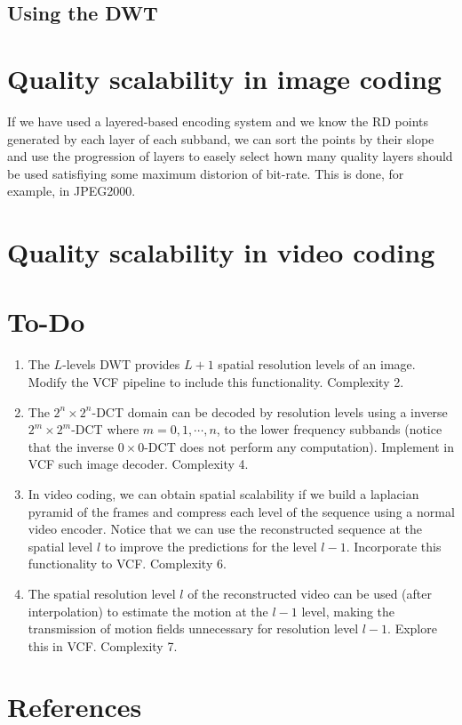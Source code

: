 \subsection{Using the DWT}

\section{Quality scalability in image coding}

If we have used a layered-based encoding system and we know the RD
points generated by each layer of each subband, we can sort the points
by their slope and use the progression of layers to easely select hown
many quality layers should be used satisfiying some maximum distorion
of bit-rate. This is done, for example, in JPEG2000.

\section{Quality scalability in video coding}

\section{To-Do}
\begin{enumerate}
\item The $L$-levels DWT provides $L+1$ spatial resolution levels of
  an image. Modify the VCF pipeline to include this
  functionality. Complexity 2.
\item The $2^n\times 2^n$-DCT domain can be decoded by resolution
  levels using a inverse $2^m\times 2^m$-DCT where $m=0,1,\cdots,n$,
  to the lower frequency subbands (notice that the inverse
  $0\times 0$-DCT does not perform any computation). Implement in VCF
  such image decoder. Complexity 4.
\item In video coding, we can obtain spatial scalability if we build a
  laplacian pyramid of the frames and compress each level of the
  sequence using a normal video encoder. Notice that we can use the
  reconstructed sequence at the spatial level $l$ to improve the
  predictions for the level $l-1$. Incorporate this functionality to
  VCF. Complexity 6.
\item The spatial resolution level $l$ of the reconstructed video can
  be used (after interpolation) to estimate the motion at the $l-1$
  level, making the transmission of motion fields unnecessary for
  resolution level $l-1$. Explore this in VCF. Complexity 7.
\end{enumerate}

\section{References}

\renewcommand{\addcontentsline}[3]{}%

